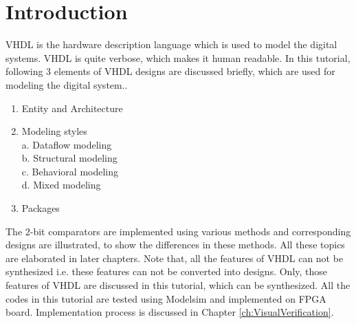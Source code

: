 \section{Introduction}
VHDL is the hardware description language which is used to model the digital systems. VHDL is quite verbose, which makes it human readable. In this tutorial, following 3 elements of VHDL designs are discussed briefly, which are used for modeling the digital system.. 
\begin{enumerate}
	\item Entity and Architecture
	\item Modeling styles\\
		a. Dataflow modeling\\
		b. Structural modeling\\
		c. Behavioral modeling\\
		d. Mixed modeling
	\item Packages
\end{enumerate}

 The 2-bit comparators are implemented using various methods and corresponding designs are illustrated, to show the differences in these methods. All these topics are elaborated in later chapters. Note that, all the features of VHDL can not be synthesized i.e. these features can not be converted into designs. Only, those features of VHDL are discussed in this tutorial, which can be synthesized. All the codes in this tutorial are tested using Modelsim and implemented on FPGA board. Implementation process is discussed in Chapter \ref{ch:VisualVerification}.
%

 